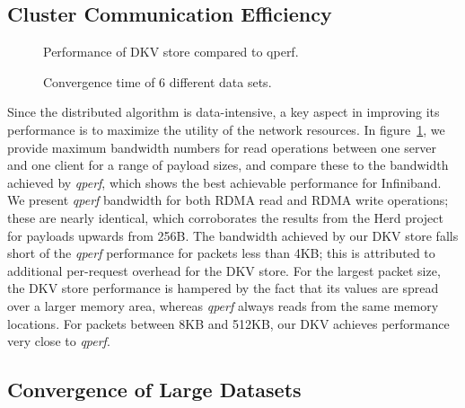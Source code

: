 \subsection{Cluster Communication Efficiency}

\begin{figure}[b] %
  \centering
  \caption{Performance of DKV store compared to qperf.}
  \label{fig-qperf}
\end{figure}

\begin{figure*}[htbp] %
  \centering
  \caption{Convergence time of 6 different data sets.}
  \label{fig-ppx}
\end{figure*}

Since the distributed algorithm is data-intensive, a key aspect in improving
its performance is to maximize the utility of the network resources.
In figure~\ref{fig-qperf}, we provide maximum bandwidth numbers for
read operations between one server and one client for a range of payload sizes,
and compare these to the bandwidth achieved by \textit{qperf}, which shows
the best achievable performance for Infiniband. We present \textit{qperf}
bandwidth for both RDMA read and RDMA write operations; these are nearly
identical, which corroborates the results from the Herd project for payloads
upwards from 256B. The bandwidth achieved by our DKV store falls short
of the \textit{qperf} performance for packets less than 4KB; this is attributed
to additional per-request overhead for the DKV store. For the largest packet
size, the DKV store performance is hampered by the fact that its values
are spread over a larger memory area, whereas \textit{qperf} always reads
from the same memory locations. For packets between 8KB and 512KB, our DKV
achieves performance very close to \textit{qperf}.

\subsection{Convergence of Large Datasets}

